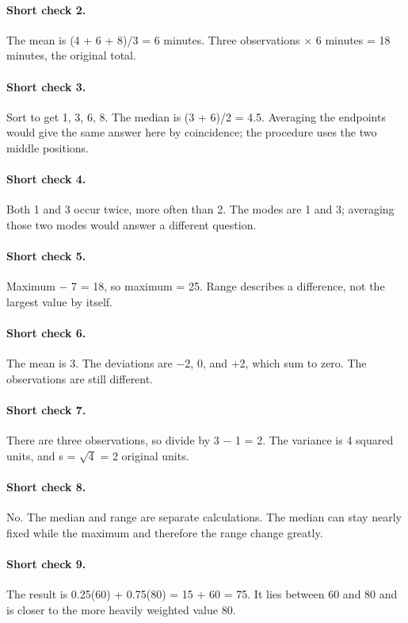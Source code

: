\paragraph{Short check 2.}
The mean is (4 + 6 + 8)/3 = 6 minutes. Three observations $\times$ 6 minutes = 18 minutes, the original total.


\paragraph{Short check 3.}
Sort to get 1, 3, 6, 8. The median is (3 + 6)/2 = 4.5. Averaging the endpoints would give the same answer here by coincidence; the procedure uses the two middle positions.


\paragraph{Short check 4.}
Both 1 and 3 occur twice, more often than 2. The modes are 1 and 3; averaging those two modes would answer a different question.


\paragraph{Short check 5.}
Maximum $-$ 7 = 18, so maximum = 25. Range describes a difference, not the largest value by itself.


\paragraph{Short check 6.}
The mean is 3. The deviations are $-$2, 0, and +2, which sum to zero. The observations are still different.


\paragraph{Short check 7.}
There are three observations, so divide by 3 $-$ 1 = 2. The variance is 4 squared units, and s = \(\sqrt{4}\) = 2 original units.


\paragraph{Short check 8.}
No. The median and range are separate calculations. The median can stay nearly fixed while the maximum and therefore the range change greatly.


\paragraph{Short check 9.}
The result is 0.25(60) + 0.75(80) = 15 + 60 = 75. It lies between 60 and 80 and is closer to the more heavily weighted value 80.


